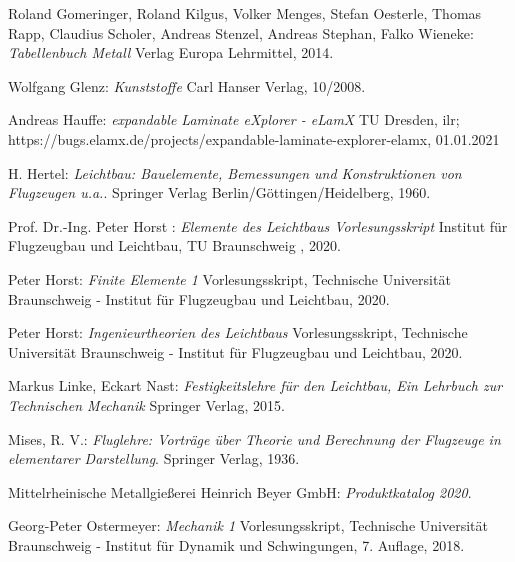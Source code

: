 \begingroup
\renewcommand{\section}[2]{}%
\begin{thebibliography}{99}  
	
	Roland Gomeringer, Roland Kilgus, Volker Menges, Stefan Oesterle, Thomas Rapp, Claudius Scholer, Andreas Stenzel, Andreas Stephan, Falko Wieneke:
	\textit{Tabellenbuch Metall}
	Verlag Europa Lehrmittel, 2014.
	
	Wolfgang Glenz:
	\textit{Kunststoffe}
	Carl Hanser Verlag, 10/2008.
	
	Andreas Hauffe:
	\textit{expandable Laminate eXplorer - eLamX} TU Dresden, ilr;
	https://bugs.elamx.de/projects/expandable-laminate-explorer-elamx, 01.01.2021
	        
	H. Hertel:
	\textit {Leichtbau: Bauelemente, Bemessungen und Konstruktionen von Flugzeugen u.a.}.
	Springer Verlag Berlin/Göttingen/Heidelberg, 1960.
	
	Prof. Dr.-Ing. Peter Horst :
	\textit{Elemente des Leichtbaus Vorlesungsskript}
	Institut für Flugzeugbau und Leichtbau, TU Braunschweig , 2020.
	
	Peter Horst:
	\textit{Finite Elemente 1}
	Vorlesungsskript, Technische Universität Braunschweig - Institut für Flugzeugbau und Leichtbau, 2020.
	
	Peter Horst:
	\textit{Ingenieurtheorien des Leichtbaus}
	Vorlesungsskript, Technische Universität Braunschweig - Institut für Flugzeugbau und Leichtbau, 2020.
	
	Markus Linke, Eckart Nast:
	\textit{Festigkeitslehre für den Leichtbau, Ein Lehrbuch zur Technischen Mechanik}
	Springer Verlag, 2015.
	
	Mises, R. V.:
	\textit {Fluglehre: Vorträge über Theorie und Berechnung der Flugzeuge in elementarer Darstellung}.
	Springer Verlag, 1936.
	
	Mittelrheinische Metallgießerei Heinrich Beyer GmbH:
	\textit{Produktkatalog 2020}.
	
	Georg-Peter Ostermeyer:
	\textit{Mechanik 1}
	Vorlesungsskript, Technische Universität Braunschweig - Institut für Dynamik und Schwingungen, 7. Auflage, 2018.
	

\end{thebibliography}
